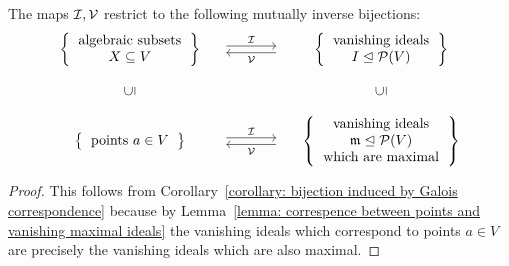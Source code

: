 \begin{corollary}
  \label{corollary: general correspondence for algebraic subsets and points}
  The maps $\mathcal{I}, \mathcal{V}$ restrict to the following mutually inverse bijections:
  \[
    \begin{matrix}
        \left\{
          \begin{tabular}{c}
              algebraic subsets \\
              $X \subseteq V$
          \end{tabular}
        \right\}
      & \begin{tikzcd}[column sep = large]
            {}
            \arrow[shift left]{r}{\mc{I}}
          & {}
            \arrow[shift left]{l}{\mc{V}}
        \end{tikzcd}
      & \left\{
          \begin{tabular}{c}
            vanishing ideals \\
            $I \idealleq \mc{P}(V)$
          \end{tabular}
        \right\}
      \\
        {}
      & {}
      & {}
      \\
        \rotatebox[origin=c]{90}{$\subseteq$}
      & {}
      & \rotatebox[origin=c]{90}{$\subseteq$}
      \\
        {}
      & {}
      & {}
      \\
        \left\{
          \begin{tabular}{c}
            points $a \in V$
          \end{tabular}
        \right\}
      & \begin{tikzcd}[column sep = large]
            {}
            \arrow[shift left]{r}{\mc{I}}
          & {}
            \arrow[shift left]{l}{\mc{V}}
        \end{tikzcd}
      & \left\{
          \begin{tabular}{c}
            vanishing ideals \\
            $\mf{m} \idealleq \mc{P}(V)$ \\
            which are maximal
          \end{tabular}
        \right\}
    \end{matrix}
  \]
\end{corollary}


\begin{proof}
  This follows from Corollary~\ref{corollary: bijection induced by Galois correspondence} because by Lemma~\ref{lemma: correspence between points and vanishing maximal ideals} the vanishing ideals which correspond to points $a \in V$ are precisely the vanishing ideals which are also maximal.
\end{proof}


